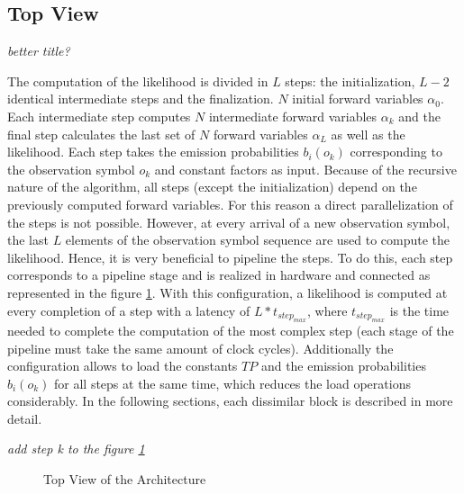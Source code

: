 \documentclass[mscthesis]{usiinfthesis}
\begin{document}
\subsection{Top View}
\emph{\color{red}better title?}

The computation of the likelihood is divided in $ L $ steps: the
initialization, $ L-2 $ identical intermediate steps and the finalization.
$ N $ initial forward variables $ \alpha_0 $. Each intermediate step computes
$ N $ intermediate forward variables $ \alpha_k $ and the final step calculates
the last set of $ N $ forward variables $ \alpha_L $ as well as the likelihood.
Each step takes the emission probabilities $ b_i(o_k) $ corresponding to the
observation symbol $ o_k $ and constant factors as input. Because of the
recursive nature of the algorithm, all steps (except the initialization) depend
on the previously computed forward variables. For this reason a direct
parallelization of the steps is not possible. However, at every arrival of
a new observation symbol, the last $ L $ elements of the observation symbol
sequence are used to compute the likelihood. Hence, it is very beneficial to
pipeline the steps. To do this, each step corresponds to a pipeline stage and is
realized in hardware and connected as represented in the figure \ref{fig:arch}.
With this configuration, a likelihood is computed at every completion of a step
with a latency of $ L * t_{step_{max}} $, where $ t_{step_{max}} $ is the time
needed to complete the computation of the most complex step (each stage of the
pipeline must take the same amount of clock cycles). Additionally the
configuration allows to load the constants $ TP $ and the emission
probabilities $ b_i(o_k) $ for all steps at the same time, which reduces the
load operations considerably. In the following sections, each dissimilar block
is described in more detail.


\emph{\color{red}add step k to the figure \ref{fig:arch}}

\begin{figure}[h]
    
    \centering
    \def\svgwidth{\columnwidth}
    \caption{Top View of the Architecture}
    \label{fig:arch}
\end{figure}
\end{document}
